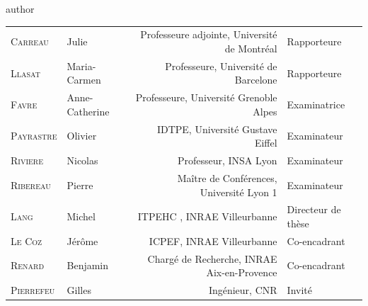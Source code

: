 \documentclass[compress,9pt]{beamer}
\begin{document}
{\begin{frame}[plain]
\begin{beamercolorbox}[sep=12pt,center,colsep=-4bp,rounded=true,shadow=true]{author}
\begin{center}
\noindent \scriptsize{
\begin{tabular}{llrl}
    	\textsc{Carreau} & Julie & Professeure adjointe, Université de Montréal & Rapporteure\\
    	\textsc{Llasat} & Maria-Carmen & Professeure, Université de Barcelone & Rapporteure\\
    	\textsc{Favre}	& Anne-Catherine & Professeure, Université Grenoble Alpes & Examinatrice\\
      	\textsc{Payrastre} & Olivier & IDTPE, Université Gustave Eiffel & Examinateur\\
      	\textsc{Riviere} & Nicolas & Professeur, INSA Lyon & Examinateur\\
      	\textsc{Ribereau} & Pierre & Maître de Conférences,  Université Lyon 1 & Examinateur\\
      	\textsc{Lang} & Michel & ITPEHC , INRAE Villeurbanne & Directeur de thèse \\
      	\textsc{Le Coz} & Jérôme & ICPEF, INRAE Villeurbanne & Co-encadrant\\
      	\textsc{Renard} & Benjamin& Chargé de Recherche, INRAE Aix-en-Provence& Co-encadrant\\
      	\textsc{Pierrefeu} & Gilles & Ingénieur, CNR & Invité \\
\end{tabular}
}
\end{center}
   
   
   
   
   
	

\end{beamercolorbox}
\end{frame}}
\end{document}
